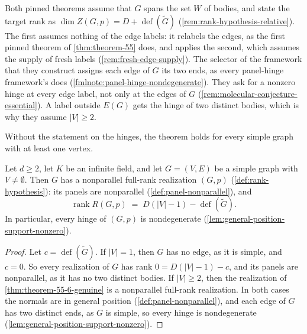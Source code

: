 \begin{fmlnote}
  Both pinned theorems assume that $G$ spans the set $W$ of bodies, and
  state the target rank as
  $\dim Z(G,p) = D + \operatorname{def}(\tilde G)$
  (\cref{rem:rank-hypothesis-relative}). The first assumes nothing of
  the edge labels: it relabels the edges, as the first pinned theorem of
  \cref{thm:theorem-55} does, and applies the second, which assumes the
  supply of fresh labels (\cref{rem:fresh-edge-supply}). The selector of
  the framework that they construct assigns each edge of $G$ its two
  ends, as every panel-hinge framework's does
  (\cref{fmlnote:panel-hinge-nondegenerate}). They ask for a nonzero
  hinge at every edge label, not only at the edges
  of $G$ (\cref{rem:molecular-conjecture-essential}). A label outside
  $E(G)$ gets the hinge of two distinct bodies, which is why they assume
  $|V| \ge 2$.
\end{fmlnote}

Without the statement on the hinges, the theorem holds for every simple
graph with at least one vertex.

\begin{theorem}
  \label{thm:theorem-55-6}
  \leanok
  Let $d \ge 2$, let $K$ be an infinite field, and let $G = (V, E)$ be a
  simple graph with $V \neq \emptyset$. Then $G$ has a nonparallel
  full-rank realization $(G, p)$ (\cref{def:rank-hypothesis}): its panels
  are nonparallel (\cref{def:panel-nonparallel}), and
  \[
    \operatorname{rank} R(G,p) \;=\; D(|V| - 1) - \operatorname{def}(\tilde G).
  \]
  In particular, every hinge of $(G, p)$ is nondegenerate
  (\cref{lem:general-position-support-nonzero}).
\end{theorem}
\begin{proof}
  \leanok
  Let $c = \operatorname{def}(\tilde G)$. If $|V| = 1$, then $G$ has no
  edge, as it is simple, and $c = 0$. So every realization of $G$ has rank
  $0 = D(|V| - 1) - c$, and its panels are nonparallel, as it has no two
  distinct bodies. If $|V| \ge 2$, then the realization of
  \cref{thm:theorem-55-6-genuine} is a nonparallel full-rank realization.
  In both cases the normals are in general position
  (\cref{def:panel-nonparallel}), and each edge of $G$ has two distinct
  ends, as $G$ is simple, so every hinge is nondegenerate
  (\cref{lem:general-position-support-nonzero}).
\end{proof}

